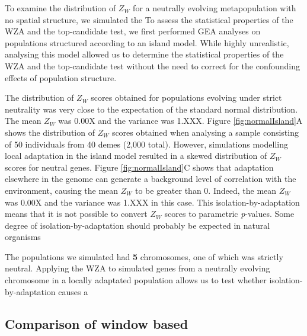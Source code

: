 \documentclass[11pt,twoside,lineno]{GSA_format}
\begin{document}
To examine the distribution of $Z_W$ for a neutrally evolving metapopulation with no spatial structure, we simulated the  
To assess the statistical properties of the WZA and the top-candidate test, we first performed GEA analyses on populations structured according to an island model. While highly unrealistic, analysing this model allowed us to determine the statistical properties of the WZA and the top-candidate test without the need to correct for the confounding effects of population structure. 

The distribution of $Z_W$ scores obtained for populations evolving under strict neutrality was very close to the expectation of the standard normal distribution. The mean $Z_W$ was 0.00X and the variance was 1.XXX. Figure \ref{fig:normalIsland}A shows the distribution of $Z_W$ scores obtained when analysing a sample consisting of 50 individuals from 40 demes (2,000 total).  However, simulations modelling local adaptation in the island model resulted in a skewed distribution of $Z_W$ scores for neutral genes. Figure \ref{fig:normalIsland}C shows that adaptation elsewhere in the genome can generate a background level of correlation with the environment, causing the mean $Z_W$ to be greater than 0. Indeed, the mean $Z_W$ was 0.00X and the variance was 1.XXX in this case. This isolation-by-adaptation means that it is not possible to convert $Z_W$ scores to parametric \textit{p}-values. 
Some degree of isolation-by-adaptation should probably be expected in natural organisms

The populations we simulated had \textbf{5} chromosomes, one of which was strictly neutral. Applying the WZA to simulated genes from a neutrally evolving chromosome in a locally adaptated population allows us to test whether isolation-by-adaptation causes a 



\subsection{Comparison of window based }
\end{document}
